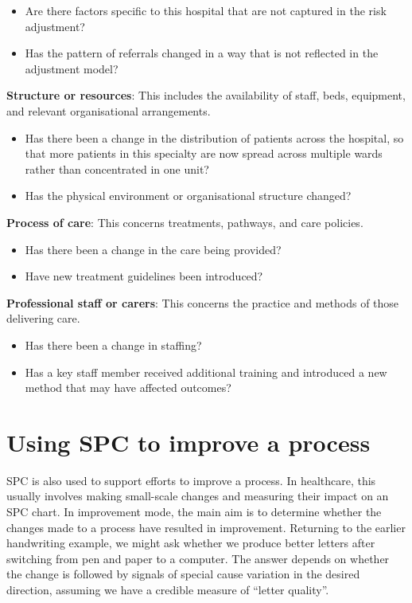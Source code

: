 \documentclass[
]{book}
\providecommand{\tightlist}{%
  \setlength{\itemsep}{0pt}\setlength{\parskip}{0pt}}
\begin{document}
\begin{itemize}
\tightlist
\item
  Are there factors specific to this hospital that are not captured in the risk adjustment?
\item
  Has the pattern of referrals changed in a way that is not reflected in the adjustment model?
\end{itemize}

\textbf{Structure or resources}: This includes the availability of staff, beds, equipment, and relevant organisational arrangements.

\begin{itemize}
\tightlist
\item
  Has there been a change in the distribution of patients across the hospital, so that more patients in this specialty are now spread across multiple wards rather than concentrated in one unit?
\item
  Has the physical environment or organisational structure changed?
\end{itemize}

\textbf{Process of care}: This concerns treatments, pathways, and care policies.

\begin{itemize}
\tightlist
\item
  Has there been a change in the care being provided?
\item
  Have new treatment guidelines been introduced?
\end{itemize}

\textbf{Professional staff or carers}: This concerns the practice and methods of those delivering care.

\begin{itemize}
\tightlist
\item
  Has there been a change in staffing?
\item
  Has a key staff member received additional training and introduced a new method that may have affected outcomes?
\end{itemize}

\section{Using SPC to improve a process}\label{using-spc-to-improve-a-process}

SPC is also used to support efforts to improve a process. In healthcare, this usually involves making small-scale changes and measuring their impact on an SPC chart. In improvement mode, the main aim is to determine whether the changes made to a process have resulted in improvement. Returning to the earlier handwriting example, we might ask whether we produce better letters after switching from pen and paper to a computer. The answer depends on whether the change is followed by signals of special cause variation in the desired direction, assuming we have a credible measure of ``letter quality''.
\end{document}
